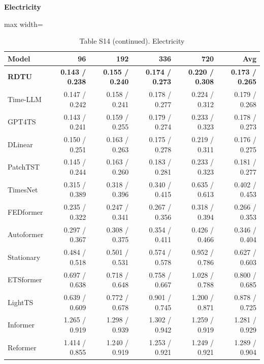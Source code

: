 \begin{table}[H]\centering\small
\caption*{Table S14 (continued). Electricity}
\textbf{Electricity}\par\smallskip
\begin{adjustbox}{max width=\linewidth}\begin{tabular}{lrrrrr}\toprule
\textbf{Model} & \textbf{96} & \textbf{192} & \textbf{336} & \textbf{720} & \textbf{Avg}\\\midrule
\rowcolor{blue!5}
\textbf{RDTU} & \textbf{0.143 / 0.238} & \textbf{0.155 / 0.240} & \textbf{0.174 / 0.273} & \textbf{0.220 / 0.308} & \textbf{0.173 / 0.265}\\
Time-LLM & 0.147 / 0.242 & 0.158 / 0.241 & 0.178 / 0.277 & 0.224 / 0.312 & 0.179 / 0.268\\
GPT4TS & 0.143 / 0.241 & 0.159 / 0.255 & 0.179 / 0.274 & 0.233 / 0.323 & 0.178 / 0.273\\
DLinear & 0.150 / 0.251 & 0.163 / 0.263 & 0.175 / 0.278 & 0.219 / 0.311 & 0.176 / 0.275\\
PatchTST & 0.145 / 0.244 & 0.163 / 0.260 & 0.183 / 0.281 & 0.233 / 0.323 & 0.181 / 0.277\\
TimesNet & 0.315 / 0.389 & 0.318 / 0.396 & 0.340 / 0.415 & 0.635 / 0.613 & 0.402 / 0.453\\
FEDformer & 0.235 / 0.322 & 0.247 / 0.341 & 0.267 / 0.356 & 0.318 / 0.394 & 0.266 / 0.353\\
Autoformer & 0.297 / 0.367 & 0.308 / 0.375 & 0.354 / 0.411 & 0.426 / 0.466 & 0.346 / 0.404\\
Stationary & 0.484 / 0.518 & 0.501 / 0.531 & 0.574 / 0.578 & 0.952 / 0.786 & 0.627 / 0.603\\
ETSformer & 0.697 / 0.638 & 0.718 / 0.648 & 0.758 / 0.667 & 1.028 / 0.788 & 0.800 / 0.685\\
LightTS & 0.639 / 0.609 & 0.772 / 0.678 & 0.901 / 0.745 & 1.200 / 0.871 & 0.878 / 0.725\\
Informer & 1.265 / 0.919 & 1.298 / 0.939 & 1.302 / 0.942 & 1.259 / 0.919 & 1.281 / 0.929\\
Reformer & 1.414 / 0.855 & 1.240 / 0.919 & 1.253 / 0.921 & 1.249 / 0.921 & 1.289 / 0.904\\
\bottomrule\end{tabular}\end{adjustbox}\end{table}

